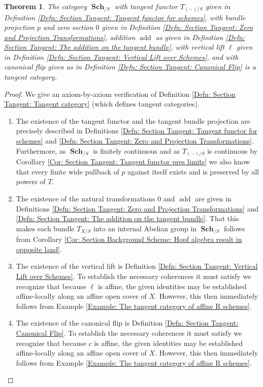 \documentclass{amsart}
\newtheorem{Theorem}[equation]{Theorem}
\theoremstyle{definition}
\DeclareMathOperator{\Sch}{\mathbf{Sch}}
\numberwithin{equation}{subsection}
\begin{document}
\begin{Theorem}\label{Thm: Section Tangents: The Tangent Category of Schemes}
The category $\Sch_{/S}$ with tangent functor $T_{(-)/S}$ given in Definition \ref{Defn: Section Tangent: Tangent functor for schemes}, with bundle projection $p$ and zero section $0$ given in Definition \ref{Defn: Section Tangent: Zero and Projection Transformations}, addition $\operatorname{add}$ as given in Definition \ref{Defn: Section Tangent: The addition on the tangent bundle}, with vertical lift $\ell$ given in Definition \ref{Defn: Section Tangent: Vertical Lift over Schemes}, and with canonical flip given as in Definition \ref{Defn: Section Tangent: Canonical Flip} is a tangent category.
\end{Theorem}
\begin{proof}
We give an axiom-by-axiom verification of Definition \ref{Defn: Section Tangent: Tangent category} (which defines tangent categories).
\begin{enumerate}
	\item The existence of the tangent functor and the tangent bundle projection are precisely described in Definitions \ref{Defn: Section Tangent: Tangent functor for schemes} and \ref{Defn: Section Tangent: Zero and Projection Transformations}. Furthermore, as $\Sch_{/S}$ is finitely continuous and as $T_{(-)/S}$ is continuous by Corollary \ref{Cor: Section Tangent: Tangent functor pres limits} we also know that every finite wide pullback of $p$ against itself exists and is preserved by all powers of $T$.
	\item The existence of the natural transformations $0$ and $\operatorname{add}$ are given in Definitions \ref{Defn: Section Tangent: Zero and Projection Transformations} and \ref{Defn: Section Tangent: The addition on the tangent bundle}. That this makes each bundle $T_{X/S}$ into an internal Abelian group in $\Sch_{/S}$ follows from Corollary \ref{Cor: Section Background Scheme: Hopf algebra result in opposite land}.
	\item The existence of the vertical lift is Definition \ref{Defn: Section Tangent: Vertical Lift over Schemes}. To establish the necessary coherences it must satisfy we recognize that because $\ell$ is affine, the given identities may be established affine-locally along an affine open cover of $X$. However, this then immediately follows from Example \ref{Example: The tangent category of affine R schemes}.
	\item The existence of the canonical flip is Definition \ref{Defn: Section Tangent: Canonical Flip}. To establish the necessary coherences it must satisfy we recognize that because $c$ is affine, the given identities may be established affine-locally along an affine open cover of $X$. However, this then immediately follows from Example \ref{Example: The tangent category of affine R schemes}.

\end{enumerate}
\end{proof}
\end{document}
